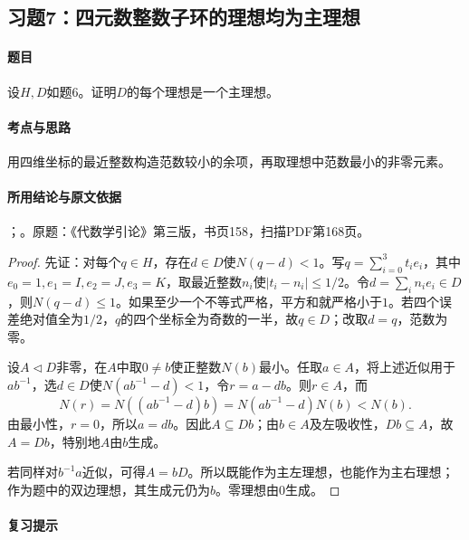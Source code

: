 \subsection{习题7：四元数整数子环的理想均为主理想}

\label{ex:4:7}

\paragraph{题目}

设$H,D$如题6。证明$D$的每个理想是一个主理想。

\paragraph{考点与思路}

用四维坐标的最近整数构造范数较小的余项，再取理想中范数最小的非零元素。

\paragraph{所用结论与原文依据}

；。原题：《代数学引论》第三版，书页158，扫描PDF第168页。


\begin{proof}

先证：对每个$q\in H$，存在$d\in D$使$N(q-d)<1$。写$q=\sum_{i=0}^3t_ie_i$，其中$e_0=1,e_1=I,e_2=J,e_3=K$，取最近整数$n_i$使$|t_i-n_i|\le1/2$。令$d=\sum_i n_ie_i\in D$，则$N(q-d)\le1$。如果至少一个不等式严格，平方和就严格小于$1$。若四个误差绝对值全为$1/2$，$q$的四个坐标全为奇数的一半，故$q\in D$；改取$d=q$，范数为零。

设$A\lhd D$非零，在$A$中取$0\ne b$使正整数$N(b)$最小。任取$a\in A$，将上述近似用于$ab^{-1}$，选$d\in D$使$N(ab^{-1}-d)<1$，令$r=a-db$。则$r\in A$，而
\[
N(r)=N((ab^{-1}-d)b)=N(ab^{-1}-d)N(b)<N(b).
\]
由最小性，$r=0$，所以$a=db$。因此$A\subseteq Db$；由$b\in A$及左吸收性，$Db\subseteq A$，故$A=Db$，特别地$A$由$b$生成。

若同样对$b^{-1}a$近似，可得$A=bD$。所以既能作为主左理想，也能作为主右理想；作为题中的双边理想，其生成元仍为$b$。零理想由$0$生成。

\end{proof}

\paragraph{复习提示}

